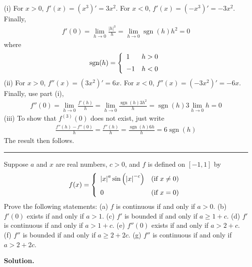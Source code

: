 \documentclass[12pt]{article}
\theoremstyle{definition}
\begin{document}
(i) For $x>0$, $f'(x)=\left(x^3\right)'=3x^2$. For $x<0$, $f'(x)=\left(-x^3\right)'=-3x^2$. Finally,
\begin{align*}
f'(0)
=\lim_{h\to 0}\frac{\left\vert h\right\vert^3}{h}
=\lim_{h\to 0}\operatorname{sgn}(h)h^2
=0
\end{align*}
where
\begin{align*}
\operatorname{sgn}(h)
=\left\{\begin{array}{ll}
1&h>0 \vspace{0.08in}\\
-1&h<0
\end{array}\right.
\end{align*}
(ii) For $x>0$, $f''(x)=\left(3x^2\right)'=6x$. For $x<0$, $f''(x)=\left(-3x^2\right)'=-6x$. Finally, use part (i),
\begin{align*}
f''(0)
=\lim_{h\to 0}\frac{f'(h)}{h}
=\lim_{h\to 0}\frac{\operatorname{sgn}(h)3h^2}{h}
=\operatorname{sgn}(h)3\lim_{h\to 0}h
=0
\end{align*}
(iii) To show that $f^{(3)}(0)$ does not exist, just write
\begin{align*}
\frac{f''(h)-f''(0)}{h}
=\frac{f''(h)}{h}
=\frac{\operatorname{sgn}(h)6h}{h}
=6\operatorname{sgn}(h)
\end{align*}
The result then follows.



\bigskip\noindent\hrule\bigskip

Suppose $a$ and $x$ are real numbers, $c>0$, and $f$ is defined on $[-1,1]$ by
\begin{align*}
f(x)=\left\{\begin{array}{ll}
\left\vert x\right\vert^a\sin\left(\left\vert x\right\vert^{-c}\right)&\mbox{(if $x\ne 0$)}\vspace{0.08in}\\
0&\mbox{(if $x=0$)}
\end{array}\right.
\end{align*}
Prove the following statements:
(a) $f$ is continuous if and only if $a>0$.
(b) $f'(0)$ exists if and only if $a>1$.
(c) $f'$ is bounded if and only if $a\ge 1+c$.
(d) $f'$ is continuous if and only if $a>1+c$.
(e) $f''(0)$ exists if and only if $a>2+c$.
(f) $f''$ is bounded if and only if $a\ge 2+2c$.
(g) $f''$ is continuous if and only if $a>2+2c$.

\smallskip
\noindent\textbf{Solution.}\quad
\end{document}

